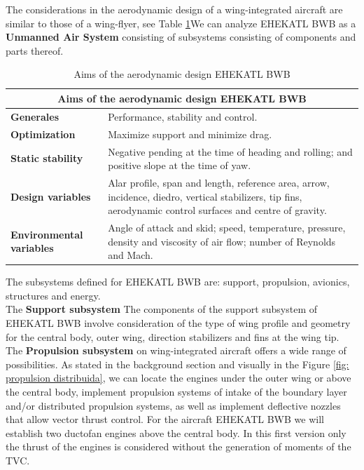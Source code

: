 The considerations in the aerodynamic design of a wing-integrated aircraft are similar to those of a wing-flyer, see Table \ref{tab: Objetivos Diseño Aerodinámico EHEKATL BWB}We can analyze EHEKATL BWB as a \textbf{Unmanned Air System} consisting of subsystems consisting of components and parts thereof. 
\begin{table}[!h]
\caption{Aims of the aerodynamic design EHEKATL BWB}
\label{tab: Objetivos Diseño Aerodinámico EHEKATL BWB}
\centering
\begin{tabular}{ |p{4cm}|p{9cm}|  }
\hline
\multicolumn{2}{|c|}{\textbf{Aims of the aerodynamic design EHEKATL BWB}}\\
\hline
\textbf{Generales} & Performance, stability and control.\\
\hline
\textbf{Optimization} & Maximize support and minimize drag. \\
\hline
\textbf{Static stability} & Negative pending at the time of heading and rolling; and positive slope at the time of yaw. \\
\hline
\textbf{Design variables} & Alar profile, span and length, reference area, arrow, incidence, diedro, vertical stabilizers, tip fins, aerodynamic control surfaces and centre of gravity. \\
\hline
\textbf{Environmental variables} & Angle of attack and skid; speed, temperature, pressure, density and viscosity of air flow; number of Reynolds and Mach. \\
\hline
\end{tabular}
\end{table}
The subsystems defined for EHEKATL BWB are: support, propulsion, avionics, structures and energy.\\
The \textbf{Support subsystem} The components of the support subsystem of EHEKATL BWB involve consideration of the type of wing profile and geometry for the central body, outer wing, direction stabilizers and fins at the wing tip. \\
The \textbf{Propulsion subsystem} on wing-integrated aircraft offers a wide range of possibilities. As stated in the background section and visually in the Figure \ref{fig: propulsion distribuida}, we can locate the engines under the outer wing or above the central body, implement propulsion systems of intake of the boundary layer and/or distributed propulsion systems, as well as implement deflective nozzles that allow vector thrust control. For the aircraft EHEKATL BWB we will establish two ductofan engines above the central body. In this first version only the thrust of the engines is considered without the generation of moments of the TVC. \\
